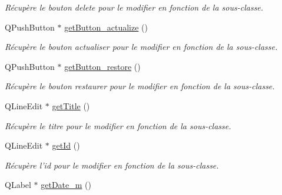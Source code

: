 \begin{DoxyCompactItemize}
\begin{DoxyCompactList}\small\item\em Récupère le bouton delete pour le modifier en fonction de la sous-\/classe. \end{DoxyCompactList}\item 
\hypertarget{class_note_editeur_aed0e7526363691449376eab2beca1a00}{Q\-Push\-Button $\ast$ \hyperlink{class_note_editeur_aed0e7526363691449376eab2beca1a00}{get\-Button\-\_\-actualize} ()}\label{class_note_editeur_aed0e7526363691449376eab2beca1a00}

\begin{DoxyCompactList}\small\item\em Récupère le bouton actualiser pour le modifier en fonction de la sous-\/classe. \end{DoxyCompactList}\item 
\hypertarget{class_note_editeur_af781dd4dc8266aba4c1f462bd07f04b9}{Q\-Push\-Button $\ast$ \hyperlink{class_note_editeur_af781dd4dc8266aba4c1f462bd07f04b9}{get\-Button\-\_\-restore} ()}\label{class_note_editeur_af781dd4dc8266aba4c1f462bd07f04b9}

\begin{DoxyCompactList}\small\item\em Récupère le bouton restaurer pour le modifier en fonction de la sous-\/classe. \end{DoxyCompactList}\item 
\hypertarget{class_note_editeur_a33711732b03990dfa5333f1522625cdf}{Q\-Line\-Edit $\ast$ \hyperlink{class_note_editeur_a33711732b03990dfa5333f1522625cdf}{get\-Title} ()}\label{class_note_editeur_a33711732b03990dfa5333f1522625cdf}

\begin{DoxyCompactList}\small\item\em Récupère le titre pour le modifier en fonction de la sous-\/classe. \end{DoxyCompactList}\item 
\hypertarget{class_note_editeur_af10fb0bcfdf1ea508dd8e10a1ae9067b}{Q\-Line\-Edit $\ast$ \hyperlink{class_note_editeur_af10fb0bcfdf1ea508dd8e10a1ae9067b}{get\-Id} ()}\label{class_note_editeur_af10fb0bcfdf1ea508dd8e10a1ae9067b}

\begin{DoxyCompactList}\small\item\em Récupère l'id pour le modifier en fonction de la sous-\/classe. \end{DoxyCompactList}\item 
\hypertarget{class_note_editeur_a76120d7a97c881fc46e6874c3431ba32}{Q\-Label $\ast$ \hyperlink{class_note_editeur_a76120d7a97c881fc46e6874c3431ba32}{get\-Date\-\_\-m} ()}\label{class_note_editeur_a76120d7a97c881fc46e6874c3431ba32}


\end{DoxyCompactItemize}

